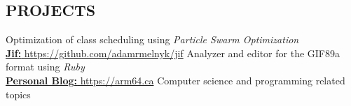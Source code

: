 \documentclass[margin, 10pt]{res} %
\begin{document}
\begin{resume}

\section{PROJECTS}
Optimization of class scheduling using {\it Particle Swarm Optimization}\\
\href{https://github.com/adamrmelnyk/jif}{{\bf Jif:} https://github.com/adamrmelnyk/jif} Analyzer and editor for the GIF89a format using {\it Ruby} \\ 
\href{https://arm64.ca}{{\bf Personal Blog:} https://arm64.ca} Computer science and programming related topics \\

\end{resume}
\end{document}
